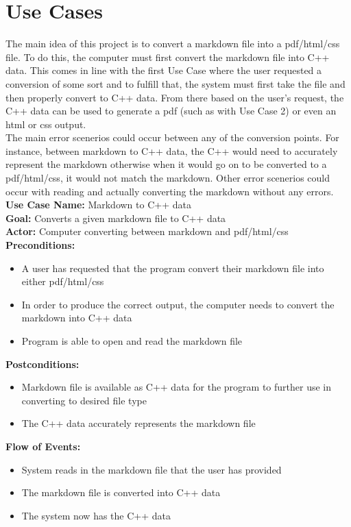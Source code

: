 \documentclass[12pt]{article}
\begin{document}
\section{Use Cases}

The main idea of this project is to convert a markdown file into a pdf/html/css file. To do this, the computer must first convert the markdown file into C++ data. This comes in line with the first Use Case where the user requested a conversion of some sort and to fulfill that, the system must first take the file and then properly convert to C++ data. From there based on the user's request, the C++ data can be used to generate a pdf (such as with Use Case 2) or even an html or css output. \\
The main error scenerios could occur between any of the conversion points. For instance, between markdown to C++ data, the C++ would need to accurately represent the markdown otherwise when it would go on to be converted to a pdf/html/css, it would not match the markdown. Other error scenerios could occur with reading and actually converting the markdown without any errors. \\
\textbf{Use Case Name:} Markdown to C++ data  
\\
\textbf{Goal:} Converts a given markdown file to C++ data
\\
\textbf{Actor:} Computer converting between markdown and pdf/html/css 
\\
\textbf{Preconditions:} 
\begin{itemize}
\item A user has requested that the program convert their markdown file into either pdf/html/css 
\item In order to produce the correct output, the computer needs to convert the markdown into C++ data 
\item Program is able to open and read the markdown file
\end{itemize}
\textbf{Postconditions:} 
\begin{itemize}
\item Markdown file is available as C++ data for the program to further use in converting to desired file type  
\item The C++ data accurately represents the markdown file
\end{itemize}
\textbf{Flow of Events:} 
\begin{itemize}
\item System reads in the markdown file that the user has provided 
\item The markdown file is converted into C++ data 
\item The system now has the C++ data 
\end{itemize}
\end{document}
